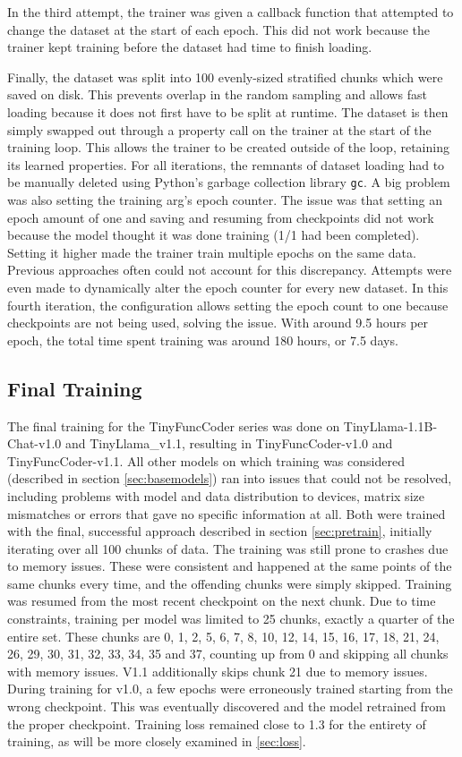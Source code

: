 In the third attempt, the trainer was given a callback function that attempted to change the dataset at the start of each epoch.
This did not work because the trainer kept training before the dataset had time to finish loading.

Finally, the dataset was split into 100 evenly-sized stratified chunks which were saved on disk.
This prevents overlap in the random sampling and allows fast loading because it does not first have to be split at runtime.
The dataset is then simply swapped out through a property call on the trainer at the start of the training loop.
This allows the trainer to be created outside of the loop, retaining its learned properties.
For all iterations, the remnants of dataset loading had to be manually deleted using Python's garbage collection library \texttt{gc}.
A big problem was also setting the training arg's epoch counter.
The issue was that setting an epoch amount of one and saving and resuming from checkpoints did not work because the model thought it was done training (1/1 had been completed).
Setting it higher made the trainer train multiple epochs on the same data.
Previous approaches often could not account for this discrepancy.
Attempts were even made to dynamically alter the epoch counter for every new dataset.
In this fourth iteration, the configuration allows setting the epoch count to one because checkpoints are not being used, solving the issue. With around 9.5 hours per epoch, the total time spent training was around 180 hours, or 7.5 days.

\subsection{Final Training}
\label{sec:finaltrain}

The final training for the TinyFuncCoder series was done on TinyLlama-1.1B-Chat-v1.0 and TinyLlama\_v1.1, resulting in TinyFuncCoder-v1.0 and TinyFuncCoder-v1.1.
All other models on which training was considered (described in section \ref{sec:basemodels}) ran into issues that could not be resolved, including problems with model and data distribution to devices, matrix size mismatches or errors that gave no specific information at all.
Both were trained with the final, successful approach described in section \ref{sec:pretrain}, initially iterating over all 100 chunks of data.
The training was still prone to crashes due to memory issues.
These were consistent and happened at the same points of the same chunks every time, and the offending chunks were simply skipped.
Training was resumed from the most recent checkpoint on the next chunk.
Due to time constraints, training per model was limited to 25 chunks, exactly a quarter of the entire set.
These chunks are 0, 1, 2, 5, 6, 7, 8, 10, 12, 14, 15, 16, 17, 18, 21, 24, 26, 29, 30, 31, 32, 33, 34, 35 and 37, counting up from 0 and skipping all chunks with memory issues. V1.1 additionally skips chunk 21 due to memory issues.
During training for v1.0, a few epochs were erroneously trained starting from the wrong checkpoint.
This was eventually discovered and the model retrained from the proper checkpoint.
Training loss remained close to 1.3 for the entirety of training, as will be more closely examined in \ref{sec:loss}.

